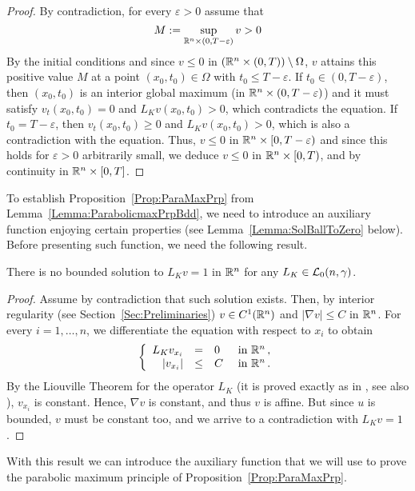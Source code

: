\begin{proof}
By contradiction, for every $\varepsilon > 0$ assume that 
$$
M:=\sup_{\mathbb{R}^n \times (0,T-\varepsilon)}v > 0
$$
By the initial conditions and since $v \leq 0 $ in $(\mathbb{R}^n \times (0,T))\setminus \Omega$, $v$  attains this positive value $M$ at a point $(x_0,t_0) \in \Omega$ with $t_0\leq T-\varepsilon$. If $t_0\in(0,T-\varepsilon)$, then $(x_0,t_0)$ is an interior global maximum (in $\mathbb{R}^n \times (0,T-\varepsilon)$) and it must satisfy $v_t(x_0,t_0)=0$ and $L_K v(x_0,t_0)>0$, which contradicts the equation. If $t_0 = T-\varepsilon$, then $v_t(x_0,t_0)\geq 0$ and $L_K v(x_0,t_0)>0$, which is also a contradiction with the equation. Thus, $v\leq 0$ in $\mathbb{R}^n\times [0,T-\varepsilon)$ and since this holds for $\varepsilon>0$ arbitrarily small, we deduce $v\leq 0$ in $\mathbb{R}^n\times [0,T)$, and by continuity in $\mathbb{R}^n\times [0,T]$.
\end{proof}

To establish Proposition~\ref{Prop:ParaMaxPrp} from Lemma~\ref{Lemma:ParabolicmaxPrpBdd}, we need to introduce an auxiliary function enjoying certain properties (see Lemma~\ref{Lemma:SolBallToZero} below). Before presenting such function, we need the following result.

\begin{lemma}
\label{Lemma:NoBddSolL=1}
There is no bounded solution to $L_K v=1$ in $\mathbb{R}^n$ for any $L_K \in \mathcal{L}_0(n,\gamma)$.
\end{lemma}

\begin{proof}
Assume by contradiction that such solution exists. Then, by interior regularity (see Section~\ref{Sec:Preliminaries}) $v\in C^1(\mathbb{R}^n)$ and $|\nabla v|\leq C$ in $\mathbb{R}^n$. For every $i = 1,\ldots, n$, we differentiate the equation with respect to $x_i$ to obtain
\begin{equation*}
\left\{\begin{array}{rcll}
L_K  v_{x_i} &=& 0 & \textrm{ in } \mathbb{R}^n\,,\\
|v_{x_i}| &\leq& C & \textrm{ in } \mathbb{R}^n\,.
\end{array} \right.
\end{equation*}
By the Liouville Theorem for the operator $L_K $ (it is proved exactly as in \cite{RosOtonSerra-Stable}, see also \cite{SerraC2s+alphaRegularity}), $v_{x_i}$ is constant. Hence, $\nabla v$ is constant, and thus $v$ is affine. But since $u$ is bounded, $v$ must be constant too, and we arrive to a contradiction with $L_K v=1$.
\end{proof}

With this result we can introduce the auxiliary function that we will use to prove the parabolic maximum principle of Proposition~\ref{Prop:ParaMaxPrp}.

